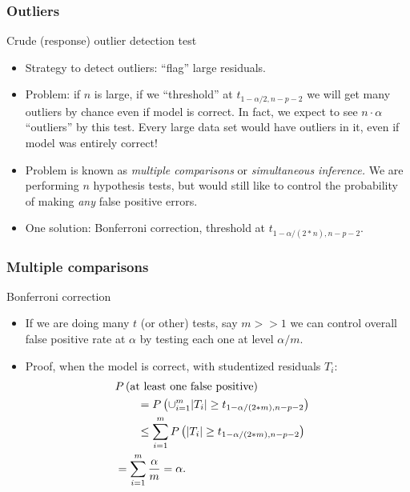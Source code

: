 \documentclass[handout]{beamer}
\begin{document}
   \begin{frame} \frametitle{Outliers}

   \begin{block}
   {Crude (response) outlier detection test}
   \begin{itemize}[<+->]


   \item Strategy to detect outliers: ``flag'' large residuals.

   \item Problem: if $n$ is large, if we ``threshold'' at $t_{1-\alpha/2, n-p-2}$ we will get many outliers by chance even if model is correct. In fact, we expect to see $n \cdot \alpha$ ``outliers'' by this test. Every large data set would have outliers in it, even if model was entirely correct!

   \item Problem is known as {\em multiple comparisons} or {\em simultaneous inference.} We are performing $n$ hypothesis tests, but would still like
   to control the probability of making {\em any} false positive errors.
   \item One solution: Bonferroni correction, threshold at
   $t_{1 - \alpha/(2*n), n-p-2}$.
   \end{itemize}

   \end{block}
   \end{frame}


   \begin{frame} \frametitle{Multiple comparisons}

   \begin{block}
   {      Bonferroni correction}
   \begin{itemize}[<+->]

   \item If we are doing many $t$ (or other) tests, say $m >>1$ we can control
   overall false positive rate at $\alpha$ by testing each one at level $\alpha/m$.

   \item Proof, when the model is correct, with studentized residuals $T_i$:
   $$
   \begin{aligned}
   \lefteqn{  P\left( \text{at least one false positive} \right)} \\
   & \qquad = P \left(\cup_{i=1}^m |T_i| \geq t_{1 - \alpha/(2*m), n-p-2} \right) \\
   & \qquad \leq \sum_{i=1}^m P \left( |T_i| \geq t_{1 - \alpha/(2*m), n-p-2} \right) \\
   & = \sum_{i=1}^m  \frac{\alpha}{m} = \alpha.
   \end{aligned}
   $$
   \end{itemize}
   \end{block}
   \end{frame}
\end{document}

